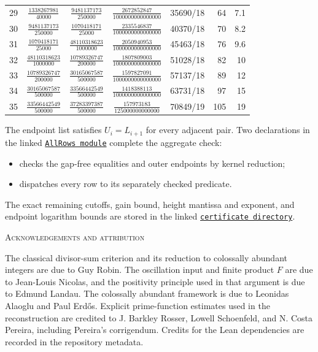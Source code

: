 \documentclass[11pt]{amsart}
\theoremstyle{definition}
\theoremstyle{remark}
\numberwithin{equation}{section}
\newcommand{\repositoryurl}{https://github.com/kimihiro64/Robin1984}
\newcommand{\proofrevision}{b359826e62c50b6cef55db4b2fcab793232498cc}
\newcommand{\codelink}[2]{%
  \href{\repositoryurl/blob/\proofrevision/#1}{\texttt{#2}}}
\newcommand{\dirlink}[2]{%
  \href{\repositoryurl/tree/\proofrevision/#1}{\texttt{#2}}}
\begin{document}
\begin{longtable}{@{}rccc rrr@{}}
29 & $\tfrac{1338267981}{40000}$ & $\tfrac{9481137173}{250000}$ & $\tfrac{2672852847}{1000000000000000}$ & 35690/18 & 64 & 7.1 \\
30 & $\tfrac{9481137173}{250000}$ & $\tfrac{1070418171}{25000}$ & $\tfrac{2335546837}{1000000000000000}$ & 40370/18 & 70 & 8.2 \\
31 & $\tfrac{1070418171}{25000}$ & $\tfrac{48110318623}{1000000}$ & $\tfrac{2050940953}{1000000000000000}$ & 45463/18 & 76 & 9.6 \\
32 & $\tfrac{48110318623}{1000000}$ & $\tfrac{10789326747}{200000}$ & $\tfrac{1807809003}{1000000000000000}$ & 51028/18 & 82 & 10 \\
33 & $\tfrac{10789326747}{200000}$ & $\tfrac{30165067587}{500000}$ & $\tfrac{1597827091}{1000000000000000}$ & 57137/18 & 89 & 12 \\
34 & $\tfrac{30165067587}{500000}$ & $\tfrac{33566442549}{500000}$ & $\tfrac{1418388113}{1000000000000000}$ & 63731/18 & 97 & 15 \\
35 & $\tfrac{33566442549}{500000}$ & $\tfrac{37283397387}{500000}$ & $\tfrac{157973183}{125000000000000}$ & 70849/19 & 105 & 19 \\
\bottomrule
\end{longtable}
\endgroup

The endpoint list satisfies $U_i=L_{i+1}$ for every adjacent pair.  Two
declarations in the linked
\codelink{Robin1984/Finite/Certificates/AllRows.lean}{AllRows module}
complete the aggregate check:
\begin{itemize}[leftmargin=1.5em,itemsep=.15em]
  \item {} checks the gap-free equalities and outer
    endpoints by kernel reduction;
  \item {} dispatches every row to its separately
    checked predicate.
\end{itemize}
The exact remaining cutoffs, gain bound, height mantissa and exponent, and
endpoint logarithm bounds are stored in the linked
\dirlink{Robin1984/Finite/Certificates}{certificate directory}.

\par\bigskip
\begin{center}
\scshape Acknowledgements and attribution
\end{center}
\smallskip

The classical divisor-sum criterion and its reduction to colossally abundant integers are due to Guy Robin.  The oscillation input and
finite product $F$ are due to Jean-Louis Nicolas, and the positivity
principle used in that argument is due to Edmund Landau.  The colossally
abundant framework is due to Leonidas Alaoglu and Paul Erd\H{o}s.  Explicit
prime-function estimates used in the reconstruction are credited to J.
Barkley Rosser, Lowell Schoenfeld, and N. Costa Pereira, including Pereira's
corrigendum.  Credits for the Lean dependencies are recorded in the repository metadata.
\end{document}
